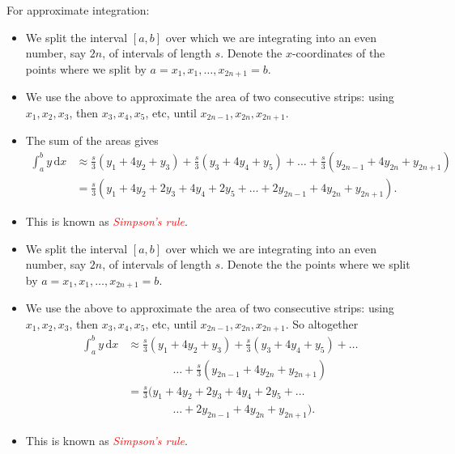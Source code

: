 \documentclass[
  11pt,
  oneside]{book}
\providecommand{\tightlist}{%
  \setlength{\itemsep}{0pt}\setlength{\parskip}{0pt}}
\theoremstyle{definition}
\theoremstyle{definition}
\theoremstyle{definition}
\theoremstyle{definition}
\theoremstyle{remark}
\begin{document}
\begin{notslides}

For approximate integration:

\begin{itemize}
\tightlist
\item
  We split the interval \([a,b]\) over which we are integrating into an even number, say \(2n\), of intervals of length \(s\). Denote the \(x\)-coordinates of the points where we split by \(a=x_1, x_1,\dots,x_{2n+1}=b\).
\item
  We use the above to approximate the area of two consecutive strips: using \(x_1,x_2,x_3\), then \(x_3,x_4,x_5\), etc, until \(x_{2n-1},x_{2n},x_{2n+1}\).
\item
  The sum of the areas gives
  \begin{align*}
  \int_{a}^{b}y\,\mathrm{d}x& \approx \frac s3\left(y_1+4y_2+y_3\right) + \frac s3\left(y_3+4y_4+y_5\right) + \dots + \frac s3\left(y_{2n-1}+4y_{2n}+y_{2n+1}\right)\\
  &=\frac s3\left(y_1+4y_2+2y_3+4y_4+2y_5+\dots +2y_{2n-1}+4y_{2n}+y_{2n+1}\right).
  \end{align*}
\item
  This is known as \textcolor{red}{\em Simpson's rule}.
\end{itemize}

\end{notslides}

\begin{slidesonly}

\begin{itemize}
\tightlist
\item
  We split the interval \([a,b]\) over which we are integrating into an even number, say \(2n\), of intervals of length \(s\). Denote the the points where we split by \(a=x_1, x_1,\dots,x_{2n+1}=b\).
\item
  We use the above to approximate the area of two consecutive strips: using \(x_1,x_2,x_3\), then \(x_3,x_4,x_5\), etc, until \(x_{2n-1},x_{2n},x_{2n+1}\). So altogether
  \begin{align*}
  \int_{a}^{b}y\,\mathrm{d}x& \approx \frac s3\left(y_1+4y_2+y_3\right) + \frac s3\left(y_3+4y_4+y_5\right) + \dots\\
  & \qquad\qquad \dots + \frac s3\left(y_{2n-1}+4y_{2n}+y_{2n+1}\right)\\
  &=\frac s3(y_1+4y_2+2y_3+4y_4+2y_5+\dots\\
  & \qquad\qquad \dots +2y_{2n-1}+4y_{2n}+y_{2n+1}).
  \end{align*}
\item
  This is known as \textcolor{red}{\em Simpson's rule}.
\end{itemize}

\end{slidesonly}
\end{document}
